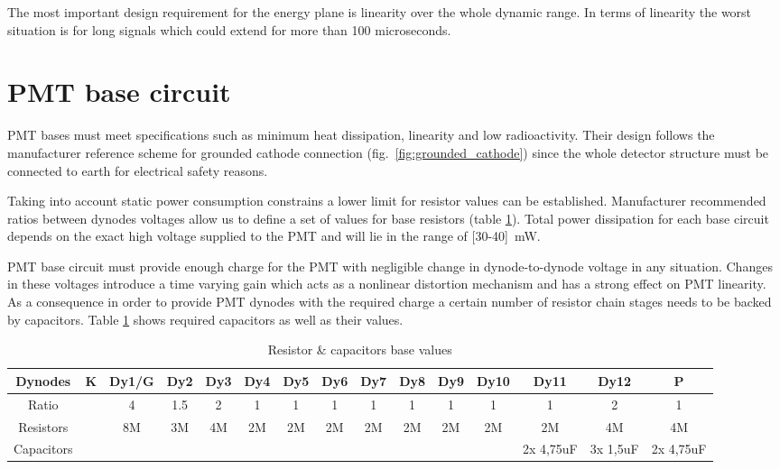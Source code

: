 \documentclass[a4paper, 10pt, oneside, twocolumn, 3p]{elsarticle}
\begin{document}
The most important design requirement for the energy plane is linearity over the whole dynamic range. In terms of linearity the worst situation is for long signals which could extend for more than 100 microseconds. 



\section {PMT base circuit}

\par PMT bases must meet specifications such as minimum heat dissipation, linearity and low radioactivity. Their design follows the manufacturer reference scheme for grounded cathode connection (fig.~\ref{fig:grounded_cathode}) since the whole detector structure must be connected to earth for electrical safety reasons.

\par Taking into account static power consumption constrains a lower limit for resistor values can be established. Manufacturer recommended ratios between dynodes voltages allow us to define a set of values for base resistors (table \ref{tab:R_C_values}). Total power dissipation for each base circuit depends on the exact high voltage supplied to the PMT and will lie in the range of [30-40]~mW. 

\par PMT base circuit must provide enough charge for the PMT with negligible change in dynode-to-dynode voltage in any situation. Changes in these voltages introduce a time varying gain which acts as a nonlinear distortion mechanism and has a strong effect on PMT linearity. As a consequence in order to provide PMT dynodes with the required charge a certain number of resistor chain stages needs to be backed by capacitors. Table \ref{tab:R_C_values} shows required capacitors as well as their values. 


\begin{table}[ht]
\scriptsize
	\caption{Resistor \& capacitors base values}
	\label{tab:R_C_values}	
	\begin{center}
		\begin{tabular}{ c | c | c | c | c | c | c | c | c | c | c | c | c | c | c |}
			Dynodes & K & Dy1/G & Dy2 & Dy3 & Dy4 & Dy5 & Dy6 & Dy7 & Dy8 & Dy9 & Dy10 & Dy11 & Dy12 & P\\
			\hline
			Ratio & &  4 & 1.5 & 2 & 1 & 1 & 1 & 1 & 1 & 1 & 1 & 1 & 2 & 1 \\
			\hline
			Resistors & & 8M & 3M & 4M & 2M & 2M & 2M & 2M & 2M & 2M & 2M & 2M & 4M & 4M  \\
			\hline
			Capacitors &  &  &  &  &  &  &  &  &  &  &  & 2x 4,75uF & 3x 1,5uF & 2x 4,75uF  \\
		\end{tabular}
	\end{center}
\end{table}
\end{document}

